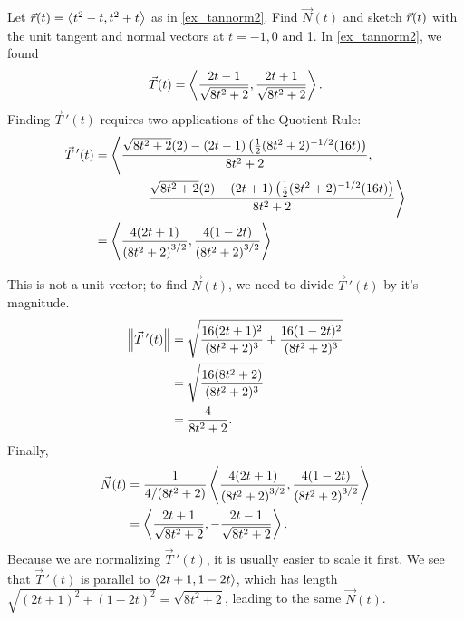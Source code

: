 \begin{example}\label{ex_tannorm4}%
Let $\vec r(t)=\left\langle t^2-t,t^2+t\right\rangle$ as in \autoref{ex_tannorm2}. Find $\vec N(t)$ and sketch $\vec r(t)$ with the unit tangent and normal vectors at $t=-1,0$ and 1.
\solution
In \autoref{ex_tannorm2}, we found
\[\vec T(t) =\left\langle \frac{2t-1}{\sqrt{8t^2+2}},\frac{2t+1}{\sqrt{8t^2+2}}\right\rangle.\]
Finding $\vec T\,'(t)$ requires two applications of the Quotient Rule:
%
\begin{align*}
\vec T\,'(t) &=
	\left\langle \frac{\sqrt{8t^2+2}(2)-(2t-1)\left(\frac12(8t^2+2)^{-1/2}(16t)\right)}{8t^2+2},\right.\\
	&\qquad\qquad\left.\frac{\sqrt{8t^2+2}(2)-(2t+1)\left(\frac12(8t^2+2)^{-1/2}(16t)\right)}{8t^2+2}\right\rangle\\
	&=\left\langle \frac{4 (2 t+1)}{\left(8 t^2+2\right)^{3/2}},
	\frac{4(1-2 t)}{\left(8 t^2+2\right)^{3/2}}\right\rangle
\end{align*}

This is not a unit vector; to find $\vec N(t)$, we need to divide $\vec T\,'(t)$ by it's magnitude.
\begin{align*}
\left\lVert \vec T\,'(t) \right\rVert &= \sqrt{\frac{16(2t+1)^2}{(8t^2+2)^3}+\frac{16(1-2t)^2}{(8t^2+2)^3}}\\
					&= \sqrt{\frac{16(8t^2+2)}{(8t^2+2)^3}}\\
					&= \frac{4}{8t^2+2}.
\end{align*}
Finally, 
\begin{align*}
\vec N(t) &= \frac1{4/(8t^2+2)}\left\langle \frac{4 (2 t+1)}{\left(8 t^2+2\right)^{3/2}},\frac{4
   (1-2 t)}{\left(8 t^2+2\right)^{3/2}}\right\rangle\\
	&=\left\langle \frac{2t+1}{\sqrt{8t^2+2}},-\frac{2t-1}{\sqrt{8t^2+2}}\right\rangle.
\end{align*}
Because we are normalizing $\vec T\,'(t)$, it is usually easier to scale it first.  We see that $\vec T\,'(t)$ is parallel to $\left\langle 2t+1,1-2t\right\rangle$, which has length $\sqrt{(2t+1)^2+(1-2t)^2}=\sqrt{8t^2+2}$, leading to the same $\vec N(t)$.


\end{example}
